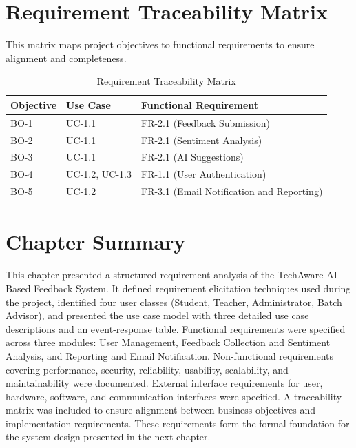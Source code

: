 \section{Requirement Traceability Matrix}

This matrix maps project objectives to functional requirements to ensure alignment and completeness.

\begin{table}[H]
\centering
\caption{Requirement Traceability Matrix}

\begin{tabularx}{\textwidth}{|p{3cm}|p{3cm}|X|}
\hline
\textbf{Objective} & \textbf{Use Case} & \textbf{Functional Requirement} \\ \hline
BO-1 & UC-1.1 & FR-2.1 (Feedback Submission) \\ \hline
BO-2 & UC-1.1 & FR-2.1 (Sentiment Analysis) \\ \hline
BO-3 & UC-1.1 & FR-2.1 (AI Suggestions) \\ \hline
BO-4 & UC-1.2, UC-1.3 & FR-1.1 (User Authentication) \\ \hline
BO-5 & UC-1.2 & FR-3.1 (Email Notification and Reporting) \\ \hline
\end{tabularx}

\end{table}



\section*{Chapter Summary}

This chapter presented a structured requirement analysis of the TechAware AI-Based Feedback System. 
It defined requirement elicitation techniques used during the project, identified four user classes (Student, Teacher, Administrator, Batch Advisor), and presented the use case model with three detailed use case descriptions and an event-response table. Functional requirements were specified across three modules: User Management, Feedback Collection and Sentiment Analysis, and Reporting and Email Notification. Non-functional requirements covering performance, security, reliability, usability, scalability, and maintainability were documented. External interface requirements for user, hardware, software, and communication interfaces were specified. A traceability matrix was included to ensure alignment between business objectives and implementation requirements. 
These requirements form the formal foundation for the system design presented in the next chapter.
